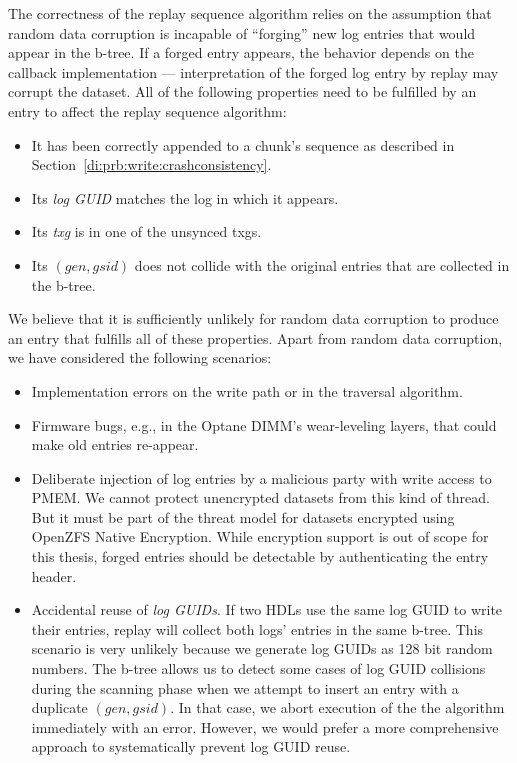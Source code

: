 \documentclass[12pt,a4paper,twoside]{book}
\begin{document}
The correctness of the replay sequence algorithm relies on the assumption that random data corruption is incapable of ``forging'' new log entries that would appear in the b-tree.
If a forged entry appears, the behavior depends on the callback implementation --- interpretation of the forged log entry by replay may corrupt the dataset.
All of the following properties need to be fulfilled by an entry to affect the replay sequence algorithm:
\begin{itemize}[noitemsep]
    \item It has been correctly appended to a chunk's sequence as described in Section~\ref{di:prb:write:crashconsistency}.
    \item Its \textit{log GUID} matches the log in which it appears.
    \item Its \textit{txg} is in one of the unsynced txgs.
    \item Its $(gen, gsid)$ does not collide with the original entries that are collected in the b-tree.
\end{itemize}
We believe that it is sufficiently unlikely for random data corruption to produce an entry that fulfills all of these properties.
Apart from random data corruption, we have considered the following scenarios:
\begin{itemize}[noitemsep]
\item Implementation errors on the write path or in the traversal algorithm.
\item Firmware bugs, e.g., in the Optane DIMM's wear-leveling layers, that could make old entries re-appear.
\item Deliberate injection of log entries by a malicious party with write access to PMEM.
    We cannot protect unencrypted datasets from this kind of thread.
    But it must be part of the threat model for datasets encrypted using OpenZFS Native Encryption.
    While encryption support is out of scope for this thesis, forged entries should be detectable by authenticating the entry header.
\item Accidental reuse of \textit{log GUIDs}.
    If two HDLs use the same log GUID to write their entries, replay will collect both logs' entries in the same b-tree.
    This scenario is very unlikely because we generate log GUIDs as 128 bit random numbers.
    The b-tree allows us to detect some cases of log GUID collisions during the scanning phase when we attempt to insert an entry with a duplicate $(gen, gsid)$.
    In that case, we abort execution of the the algorithm immediately with an error.
    However, we would prefer a more comprehensive approach to systematically prevent log GUID reuse.
\end{itemize}
\end{document}
